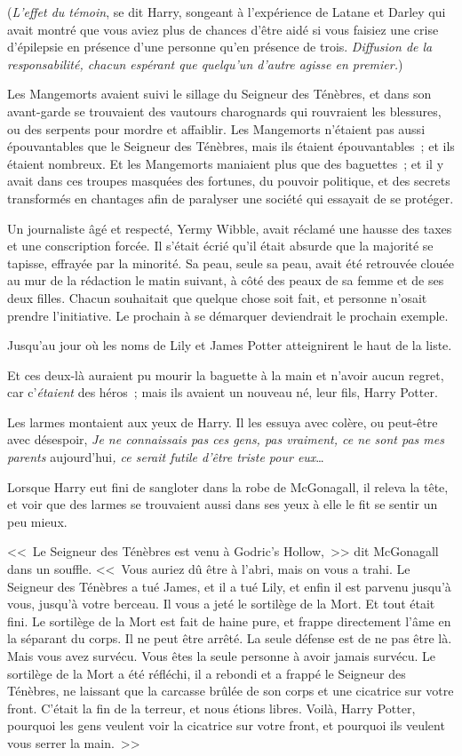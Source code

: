 (\emph{L'effet du témoin}, se dit Harry, songeant à l'expérience de Latane et Darley qui avait montré que vous aviez plus de chances d'être aidé si vous faisiez une crise d'épilepsie en présence d'une personne qu'en présence de trois. \emph{Diffusion de la responsabilité, chacun espérant que quelqu'un d'autre agisse en premier.})

Les Mangemorts avaient suivi le sillage du Seigneur des Ténèbres, et dans son avant-garde se trouvaient des vautours charognards qui rouvraient les blessures, ou des serpents pour mordre et affaiblir. Les Mangemorts n'étaient pas aussi épouvantables que le Seigneur des Ténèbres, mais ils étaient épouvantables~; et ils étaient nombreux. Et les Mangemorts maniaient plus que des baguettes~; et il y avait dans ces troupes masquées des fortunes, du pouvoir politique, et des secrets transformés en chantages afin de paralyser une société qui essayait de se protéger.

Un journaliste âgé et respecté, Yermy Wibble, avait réclamé une hausse des taxes et une conscription forcée. Il s'était écrié qu'il était absurde que la majorité se tapisse, effrayée par la minorité. Sa peau, seule sa peau, avait été retrouvée clouée au mur de la rédaction le matin suivant, à côté des peaux de sa femme et de ses deux filles. Chacun souhaitait que quelque chose soit fait, et personne n'osait prendre l'initiative. Le prochain à se démarquer deviendrait le prochain exemple.

Jusqu'au jour où les noms de Lily et James Potter atteignirent le haut de la liste.

Et ces deux-là auraient pu mourir la baguette à la main et n'avoir aucun regret, car c'\emph{étaient} des héros~; mais ils avaient un nouveau né, leur fils, Harry Potter.

Les larmes montaient aux yeux de Harry. Il les essuya avec colère, ou peut-être avec désespoir, \emph{Je ne connaissais pas ces gens, pas vraiment, ce ne sont pas mes parents} aujourd'hui\emph{, ce serait futile d'être triste pour eux}…

Lorsque Harry eut fini de sangloter dans la robe de McGonagall, il releva la tête, et voir que des larmes se trouvaient aussi dans ses yeux à elle le fit se sentir un peu mieux.

<<~Le Seigneur des Ténèbres est venu à Godric's Hollow,~>> dit McGonagall dans un souffle. <<~Vous auriez dû être à l'abri, mais on vous a trahi. Le Seigneur des Ténèbres a tué James, et il a tué Lily, et enfin il est parvenu jusqu'à vous, jusqu'à votre berceau. Il vous a jeté le sortilège de la Mort. Et tout était fini. Le sortilège de la Mort est fait de haine pure, et frappe directement l'âme en la séparant du corps. Il ne peut être arrêté. La seule défense est de ne pas être là. Mais vous avez survécu. Vous êtes la seule personne à avoir jamais survécu. Le sortilège de la Mort a été réfléchi, il a rebondi et a frappé le Seigneur des Ténèbres, ne laissant que la carcasse brûlée de son corps et une cicatrice sur votre front. C'était la fin de la terreur, et nous étions libres. Voilà, Harry Potter, pourquoi les gens veulent voir la cicatrice sur votre front, et pourquoi ils veulent vous serrer la main.~>>

